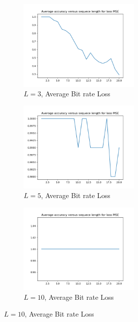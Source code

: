 \begin{figure}[!htbp]
\begin{subfigure}
\centering
\includegraphics[angle=0,width=0.65\textwidth]{assign-3/logs/AV-Loss-3-MSE-hidden-5.png}
\caption{$L=3$, Average Bit rate Loss}
\end{subfigure}
\begin{subfigure}
\centering
\includegraphics[angle=0,width=0.65\textwidth]{assign-3/logs/AV-Loss-5-MSE-hidden-5.png}
\caption{$L=5$, Average Bit rate Loss}
\end{subfigure}
\begin{subfigure}
\centering
\includegraphics[angle=0,width=0.65\textwidth]{assign-3/logs/AV-Loss-10-MSE-hidden-5.png}
\caption{$L=10$, Average Bit rate Loss}
\end{subfigure}
\end{figure}






 